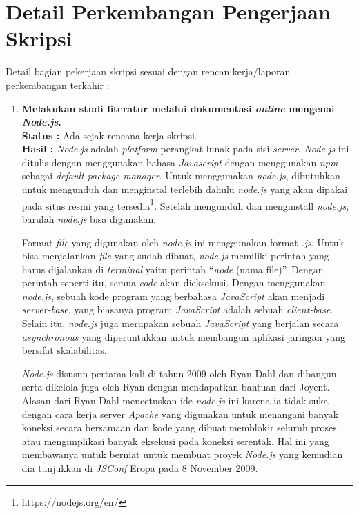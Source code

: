 \documentclass[a4paper,twoside]{article}
\begin{document}
\section{Detail Perkembangan Pengerjaan Skripsi}
Detail bagian pekerjaan skripsi sesuai dengan rencan kerja/laporan perkembangan terkahir :
	\begin{enumerate}
		\item \textbf{Melakukan studi literatur melalui dokumentasi \textit{online} mengenai \textit{Node.js}.}\\
		{\bf Status :} Ada sejak rencana kerja skripsi.\\
		{\bf Hasil :} \textit{Node.js} adalah \textit{platform} perangkat lunak pada sisi \textit{server}. \textit{Node.js} ini ditulis dengan menggunakan bahasa \textit{Javascript} dengan menggunakan \textit{npm} sebagai \textit{default package manager}. Untuk menggunakan \textit{node.js}, dibutuhkan untuk mengunduh dan menginstal terlebih dahulu \textit{node.js} yang akan dipakai pada situs resmi yang tersedia\footnote{https://nodejs.org/en/}. Setelah mengunduh dan menginstall \textit{node.js}, barulah \textit{node.js} bisa digunakan. 

Format \textit{file} yang digunakan oleh \textit{node.js} ini menggunakan format \textit{.js}. Untuk bisa menjalankan \textit{file} yang sudah dibuat, \textit{node.js} memiliki perintah yang harus dijalankan di \textit{terminal} yaitu perintah ``\textit{node} (nama file)''. Dengan perintah seperti itu, semua \textit{code} akan dieksekusi. Dengan menggunakan \textit{node.js}, sebuah kode program yang berbahasa \textit{JavaScript} akan menjadi \textit{server-base}, yang biasanya program \textit{JavaScript} adalah sebuah \textit{client-base}. Selain itu, \textit{node.js} juga merupakan sebuah \textit{JavaScript} yang berjalan secara \textit{asynchronous} yang diperuntukkan untuk membangun aplikasi jaringan yang bersifat skalabilitas. 

\textit{Node.js} disusun pertama kali di tahun 2009 oleh Ryan Dahl dan dibangun serta dikelola juga oleh Ryan dengan mendapatkan bantuan dari Joyent. Alasan dari Ryan Dahl mencetuskan ide \textit{node.js} ini karena ia tidak suka dengan cara kerja server \textit{Apache} yang digunakan untuk menangani banyak koneksi secara bersamaan dan kode yang dibuat memblokir seluruh proses atau mengimplikasi banyak eksekusi pada koneksi serentak. Hal ini yang membawanya untuk berniat untuk membuat proyek \textit{Node.js} yang kemudian dia tunjukkan di \textit{JSConf} Eropa pada 8 November 2009. 


\end{enumerate}
\end{document}
